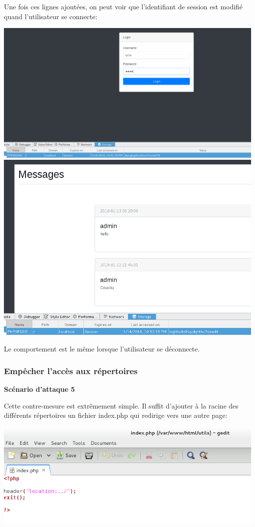\documentclass{article}
\begin{document}
Une fois ces lignes ajoutées, on peut voir que l'identifiant de session
est modifié quand l'utilisateur se connecte:

\includegraphics{images/session1.PNG}
\includegraphics{images/session2.PNG}

Le comportement est le même lorsque l'utilisateur se déconnecte.

\hypertarget{empuxeacher-laccuxe8s-aux-ruxe9pertoires}{%
\subsubsection{Empêcher l'accès aux
répertoires}\label{empuxeacher-laccuxe8s-aux-ruxe9pertoires}}

\textbf{Scénario d'attaque 5}

Cette contre-mesure est extrêmement simple. Il suffit d'ajouter à la
racine des différents répertoires un fichier index.php qui redirige vers
une autre page:

\includegraphics{images/repertoire_fix.PNG}
\end{document}
